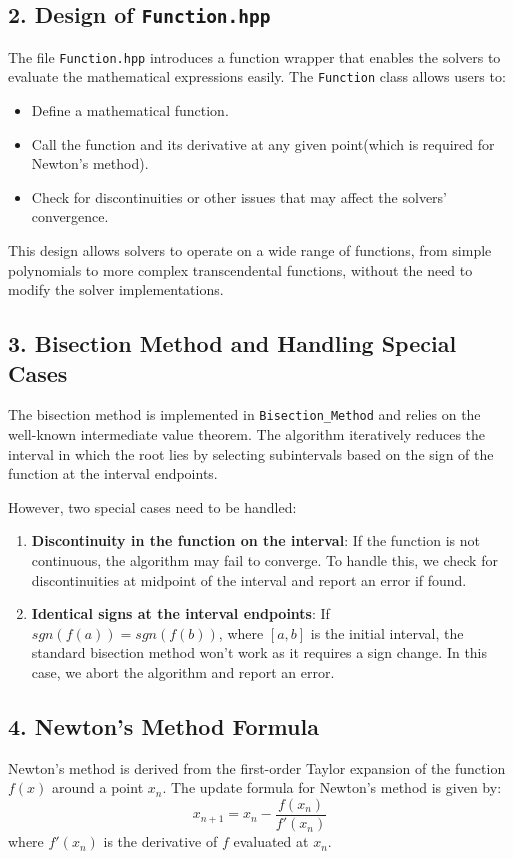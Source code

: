 \documentclass[a4paper]{article}
\begin{document}
\subsection*{2. Design of \texttt{Function.hpp}}
The file \texttt{Function.hpp} introduces a function wrapper that enables the solvers to evaluate the mathematical expressions easily. The \texttt{Function} class allows users to:
\begin{itemize}
    \item Define a mathematical function.
    \item Call the function and its derivative at any given point(which is required for Newton's method).
    \item Check for discontinuities or other issues that may affect the solvers' convergence.
\end{itemize}

This design allows solvers to operate on a wide range of functions, from simple polynomials to more complex transcendental functions, without the need to modify the solver implementations.

\subsection*{3. Bisection Method and Handling Special Cases}
The bisection method is implemented in \texttt{Bisection\_Method} and relies on the well-known intermediate value theorem. The algorithm iteratively reduces the interval in which the root lies by selecting subintervals based on the sign of the function at the interval endpoints.

However, two special cases need to be handled:
\begin{enumerate}
    \item \textbf{Discontinuity in the function on the interval}: If the function is not continuous, the algorithm may fail to converge. To handle this, we check for discontinuities at midpoint of the interval and report an error if found.
    \item \textbf{Identical signs at the interval endpoints}: If \( sgn(f(a)) = sgn(f(b)) \), where \( [a, b] \) is the initial interval, the standard bisection method won't work as it requires a sign change. In this case, we abort the algorithm and report an error.
\end{enumerate}

\subsection*{4. Newton's Method Formula}
Newton's method is derived from the first-order Taylor expansion of the function \( f(x) \) around a point \( x_n \). The update formula for Newton's method is given by:
\[
x_{n+1} = x_n - \frac{f(x_n)}{f'(x_n)}
\]
where \( f'(x_n) \) is the derivative of \( f \) evaluated at \( x_n \).
\end{document}
